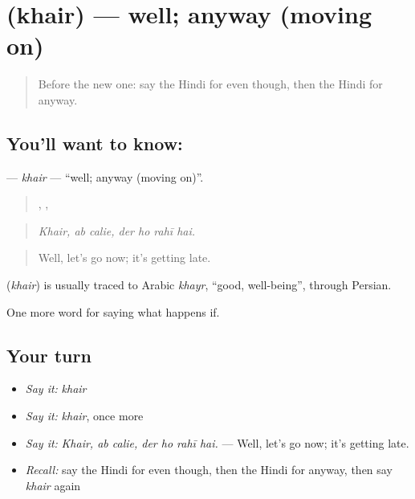 \section[\texorpdfstring{\hi{ख़ैर} (khair)}{ख़ैर (khair)}]{ (khair) — well; anyway (moving on)}

\label{lesson:HI-C552-khair}



\begin{quote}
Before the new one: say the Hindi for even though, then the Hindi for anyway.
\end{quote}

\subsection*{You'll want to know: }
\textbf{} — \emph{khair} — \textquotedblleft{}well; anyway (moving on)\textquotedblright{}.

\begin{quote}
,  ,    
\end{quote}

\begin{quote}
\emph{Khair, ab calie, der ho rahī hai.}
\end{quote}

\begin{quote}
Well, let's go now; it's getting late.
\end{quote}

\begin{cousinweb}
\textbf{} (\emph{khair}) is usually traced to Arabic \emph{khayr}, \textquotedblleft{}good, well-being\textquotedblright{}, through Persian.
\end{cousinweb}

\begin{grammarlens}[title={What you've built}]
One more word for saying what happens if.
\end{grammarlens}

\subsection*{Your turn}
\begin{itemize}
\raggedright
  \item \emph{Say it:} \emph{khair}
  \item \emph{Say it:} \emph{khair}, once more
  \item \emph{Say it:} \emph{Khair, ab calie, der ho rahī hai.} — Well, let's go now; it's getting late.
  \item \emph{Recall:} say the Hindi for even though, then the Hindi for anyway, then say \emph{khair} again
\end{itemize}

